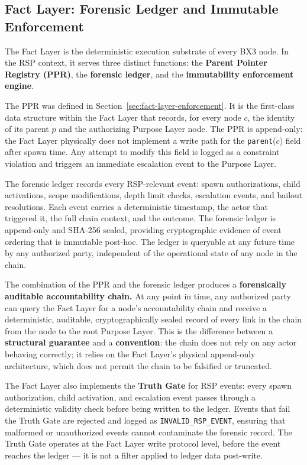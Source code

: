 
\subsection{Fact Layer: Forensic Ledger and Immutable Enforcement}
\label{sec:fact-layer-rsp}

The Fact Layer is the deterministic execution substrate of every BX3 node. In the RSP context, it serves three distinct functions: the \textbf{Parent Pointer Registry (PPR)}, the \textbf{forensic ledger}, and the \textbf{immutability enforcement engine}.

The PPR was defined in Section~\ref{sec:fact-layer-enforcement}. It is the first-class data structure within the Fact Layer that records, for every node $c$, the identity of its parent $p$ and the authorizing Purpose Layer node. The PPR is append-only: the Fact Layer physically does not implement a write path for the \texttt{parent}($c$) field after spawn time. Any attempt to modify this field is logged as a constraint violation and triggers an immediate escalation event to the Purpose Layer.

The forensic ledger records every RSP-relevant event: spawn authorizations, child activations, scope modifications, depth limit checks, escalation events, and bailout resolutions. Each event carries a deterministic timestamp, the actor that triggered it, the full chain context, and the outcome. The forensic ledger is append-only and SHA-256 sealed, providing cryptographic evidence of event ordering that is immutable post-hoc. The ledger is queryable at any future time by any authorized party, independent of the operational state of any node in the chain.

The combination of the PPR and the forensic ledger produces a \textbf{forensically auditable accountability chain.} At any point in time, any authorized party can query the Fact Layer for a node's accountability chain and receive a deterministic, auditable, cryptographically sealed record of every link in the chain from the node to the root Purpose Layer. This is the difference between a \textbf{structural guarantee} and a \textbf{convention}: the chain does not rely on any actor behaving correctly; it relies on the Fact Layer's physical append-only architecture, which does not permit the chain to be falsified or truncated.

The Fact Layer also implements the \textbf{Truth Gate} for RSP events: every spawn authorization, child activation, and escalation event passes through a deterministic validity check before being written to the ledger. Events that fail the Truth Gate are rejected and logged as \texttt{INVALID\_RSP\_EVENT}, ensuring that malformed or unauthorized events cannot contaminate the forensic record. The Truth Gate operates at the Fact Layer write protocol level, before the event reaches the ledger — it is not a filter applied to ledger data post-write.

